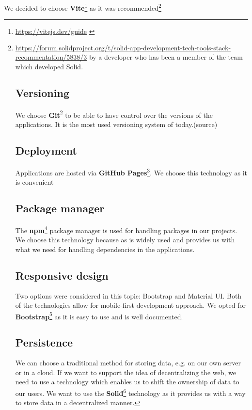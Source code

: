 We decided to choose \textbf{Vite}\footnote{\url{https://vitejs.dev/guide}  \label{fnlabel}} as it was recommended\footnote{\url{https://forum.solidproject.org/t/solid-app-development-tech-tools-stack-recommentation/5838/3} by a developer who has been a member of the team which developed Solid.

\subsection*{Versioning}
We choose \textbf{Git}\footnote{\url{https://git-scm.com/docs}  \label{fnlabel}} to be able to have control over the versions of the applications.
It is the most used versioning system of today.(source)

\subsection*{Deployment}
Applications are hosted via \textbf{GitHub Pages}\footnote{\url{https://docs.github.com/en/pages}  \label{fnlabel}}.
We choose this technology as it is convenient

\subsection*{Package manager}
The \textbf{npm}\footnote{\url{https://docs.npmjs.com} \label{fnlabel}} package manager is used for handling packages in our projects.
We choose this technology because as is widely used and provides us with what we need for handling dependencies in the applications.

\subsection*{Responsive design}
Two options were considered in this topic: Bootstrap and Material UI.
Both of the technologies allow for mobile-first development approach.
We opted for \textbf{Bootstrap}\footnote{\url{https://getbootstrap.com} \label{fnlabel}} as it is easy to use and is well documented.

\subsection*{Persistence}
We can choose a traditional method for storing data, e.g. on our own server or in a cloud.
If we want to support the idea of decentralizing the web, we need to use a technology which enables us to shift the ownership of data to our users.
We want to use the \textbf{Solid}\footnote{\url{https://solidproject.org}  \label{fnlabel}} technology as it provides us with a way to store data in a decentralized manner.

}
